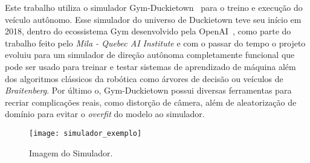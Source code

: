 Este trabalho utiliza o simulador Gym-Duckietown~\citep{gym-duckietown} para o treino e execução do veículo autônomo. Esse simulador do universo de Duckietown teve seu início em 2018, dentro do ecossistema Gym desenvolvido pela OpenAI~\citep{1606.01540}, como parte do trabalho feito pelo \textit{Mila - Quebec AI Institute} e com o passar do tempo o projeto evoluiu para um simulador de direção autônoma completamente funcional que pode ser usado para treinar e testar sistemas de aprendizado de máquina além dos algoritmos clássicos da robótica como árvores de decisão ou veículos de \textit{Braitenberg}. Por último o, Gym-Duckietown possui diversas ferramentas para recriar complicações reais, como distorção de câmera, além de aleatorização de domínio para evitar o \textit{overfit} do modelo ao simulador.

\begin{figure}
	\centering
	\texttt{[image: simulador\_exemplo]}
	\caption{Imagem do Simulador.\label{fig:simulador_exemplo}}
\end{figure}


